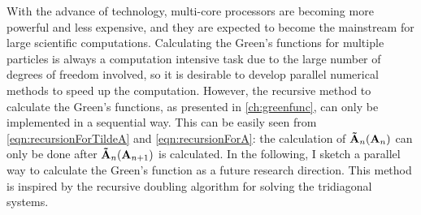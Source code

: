 With the advance of technology, multi-core processors are becoming more powerful and less expensive, and they are 
expected 
to become the mainstream for large scientific computations. Calculating the Green's functions for multiple particles is 
always a computation intensive task due to the large number of degrees of freedom involved, so it is desirable to 
develop parallel numerical methods to speed up the computation. 
However, the recursive method to calculate the Green's 
functions, as presented in \autoref{ch:greenfunc}, can only be implemented in a sequential way.  This can be easily 
seen from \autoref{eqn:recursionForTildeA} and \autoref{eqn:recursionForA}: the calculation of  
$\mathbf{\Tilde{A}}_{n} (\mathbf{A}_n)$ can only be done after $\mathbf{\Tilde{A}}_{n} (\mathbf{A}_{n+1})$ is 
calculated.  In the following, I sketch a parallel way to calculate the Green's function as a future research 
direction. This method is inspired by the recursive doubling algorithm for solving the tridiagonal 
systems\cite{egecioglu1989}. 

